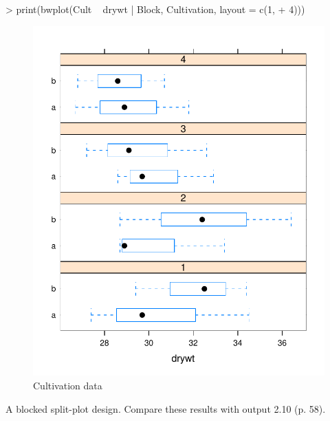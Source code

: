 \documentclass[12pt]{article}
\begin{document}
\begin{Schunk}
\begin{Sinput}
> print(bwplot(Cult ~ drywt | Block, Cultivation, layout = c(1, 
+     4)))
\end{Sinput}
\end{Schunk}
\begin{figure}[tbp]
  \centering
  \includegraphics{figs/f-cult1}
  \caption{Cultivation data}
  \label{fig:adg1}
\end{figure}

A blocked split-plot design.  Compare these results with output 2.10 (p. 58).
\end{document}
